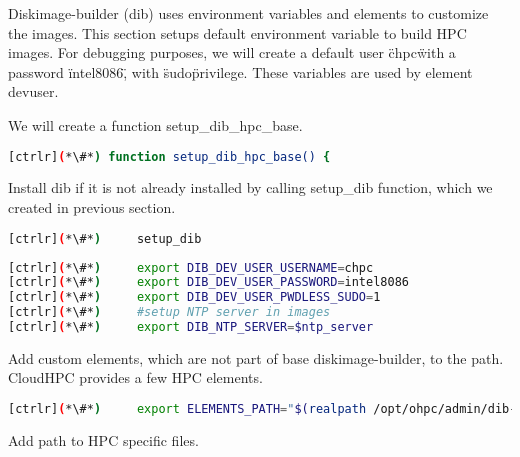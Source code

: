 
	Diskimage-builder (dib) uses environment variables and elements to customize the images. This section setups default environment variable to build HPC images. For debugging purposes, we will create a default user \"chpc\" with a password \"intel8086\", with \"sudo\" privilege. These variables are used by element devuser. 

	We will create a function setup\_dib\_hpc\_base.

\begin{lstlisting}[language=bash,keywords={}]
[ctrlr](*\#*) function setup_dib_hpc_base() {
\end{lstlisting}

	Install dib if it is not already installed by calling setup\_dib function, which we created in previous section.

\begin{lstlisting}[language=bash,keywords={}]
[ctrlr](*\#*)     setup_dib
\end{lstlisting}

\begin{lstlisting}[language=bash,keywords={}]
[ctrlr](*\#*)     export DIB_DEV_USER_USERNAME=chpc
[ctrlr](*\#*)     export DIB_DEV_USER_PASSWORD=intel8086
[ctrlr](*\#*)     export DIB_DEV_USER_PWDLESS_SUDO=1
[ctrlr](*\#*)     #setup NTP server in images
[ctrlr](*\#*)     export DIB_NTP_SERVER=$ntp_server
\end{lstlisting}

	Add custom elements, which are not part of base diskimage-builder, to the path. CloudHPC provides a few HPC elements. 

\begin{lstlisting}[language=bash,keywords={}]
[ctrlr](*\#*)     export ELEMENTS_PATH="$(realpath /opt/ohpc/admin/dib-chpc/elements/)"
\end{lstlisting}

	Add path to HPC specific files.

